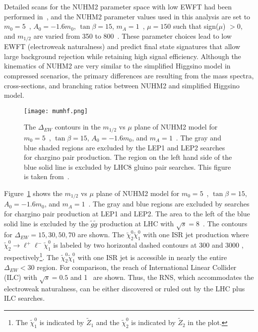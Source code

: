 Detailed scans for the NUHM2 parameter space with low EWFT had been performed in~\cite{Baer:2013xua}, and the NUHM2 parameter values used in this analysis are set to $m_{0} = 5$~{\TeV}, $A_{0} = -1.6 m_{0}$, $\tan\beta = 15$, $m_{A} = 1$~{\TeV}, $\mu = 150$ such that sign($\mu$) $> 0$, and $m_{1/2}$ are varied from 350 to 800~{\GeV}.
These parameter choices lead to low EWFT (electroweak naturalness) and predict final state signatures that allow large background rejection while retaining high signal efficiency.
Although the kinematics of NUHM2 are very similar to the simplified Higgsino model in compressed scenarios, the primary differences are resulting from the mass spectra, cross-sections, and branching ratios between NUHM2 and simplified Higgsino model.

\begin{figure}[htb]
    \begin{center}
        \texttt{[image: mumhf.png]}
        \caption{The $\Delta_{EW}$ contours in the $m_{1/2}$ vs $\mu$ plane of NUHM2 model for $m_{0} =  5$~{\GeV}, $\tan\beta = 15$, $A_{0} = -1.6 m_{0}$, and $m_{A} = 1$~{\TeV}.
        The gray and blue shaded regions are excluded by the LEP1 and LEP2 searches for chargino pair production.
        The region on the left hand side of the blue solid line is excluded by LHC8 gluino pair searches.
        This figure is taken from~\cite{Baer:2016usl}.}
        \label{fig:susy_mumhf}
    \end{center}
\end{figure}

Figure~\ref{fig:susy_mumhf} shows the $m_{1/2}$ vs $\mu$ plane of NUHM2 model for $m_{0} =  5$~{\GeV}, $\tan\beta = 15$, $A_{0} = -1.6 m_{0}$, and $m_{A} = 1$~{\TeV}.
The gray and blue regions are excluded by searches for chargino pair production at LEP1 and LEP2.
The area to the left of the blue solid line is excluded by the $\widetilde{g} \widetilde{g}$ production at LHC with $\sqrt{s} = 8$~{\TeV}.
The contours for $\Delta_{EW} = 15, 30, 50, 70$ are shown.
The $\widetilde{\chi}^{0}_{2} \widetilde{\chi}^{0}_{1}$ with one ISR jet production where $\widetilde{\chi}^{0}_{2} \to \ell^{+} \ell^{-} \widetilde{\chi}^{0}_{1}$ is labeled by two horizontal dashed contours at 300 \ifb and 3000 \ifb, respectively\footnote{The $\widetilde{\chi}^{0}_{1}$ is indicated by $\widetilde{Z}_{1}$ and the $\widetilde{\chi}^{0}_{2}$ is indicated by $\widetilde{Z}_{2}$ in the plot.}.
The $\widetilde{\chi}^{0}_{2} \widetilde{\chi}^{0}_{1}$ with one ISR jet is accessible in nearly the entire $\Delta_{EW} < 30$ region.
For comparison, the reach of International Linear Collider (ILC) with $\sqrt{s} = 0.5$ and 1~{\TeV} are shown.
Thus, the RNS, which accommodates the electroweak naturalness, can be either discovered or ruled out by the LHC plus ILC searches.
